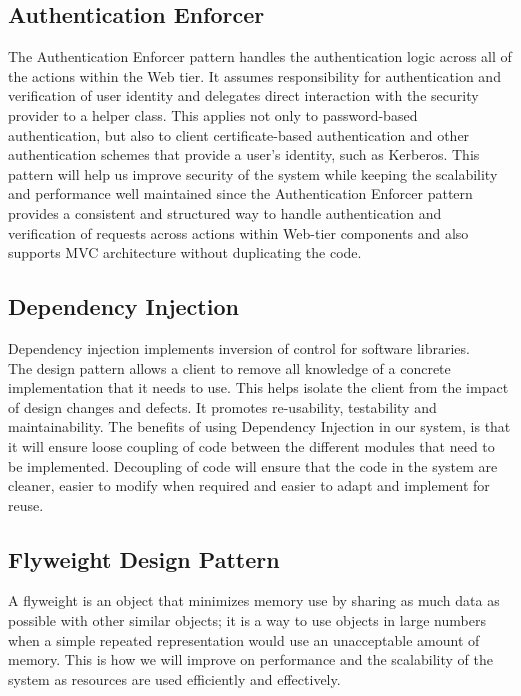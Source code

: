 
\subsection{Authentication Enforcer} 
\begin{flushleft}
The Authentication Enforcer pattern handles the authentication logic across all of the actions within the Web tier. It assumes responsibility for authentication and verification of user identity and delegates direct interaction with the security provider to a helper class. This applies not only to password-based authentication, but also to client certificate-based authentication and other authentication schemes that provide a user's identity, such as Kerberos.
This pattern will help us improve security of the system while keeping the scalability and performance well maintained since the Authentication Enforcer pattern provides a consistent and structured way to handle authentication and verification of requests across actions within Web-tier components and also supports MVC architecture without duplicating the code.
\end{flushleft}

\subsection{Dependency Injection}
\begin{flushleft}
Dependency injection implements inversion of control for software libraries.\\
The design pattern allows a client to remove all
knowledge of a concrete implementation that it needs to use. This helps isolate the client
from the impact of design changes and defects. It promotes re-usability, testability and
maintainability.
The benefits of using Dependency Injection in our system, is that it will ensure loose coupling of code between the different modules that need to be implemented. Decoupling of code will ensure that the code in the system are cleaner, easier to modify when required and easier to adapt and implement for reuse.
\end{flushleft}

\subsection{Flyweight Design Pattern}
\begin{flushleft}
A flyweight is an object that minimizes memory use by sharing as much data as possible with other similar objects; it is a way to use objects in large numbers when a simple repeated representation would use an unacceptable amount of memory. This is how we will improve on performance and the scalability of the system as resources are used efficiently and effectively.
\end{flushleft}

